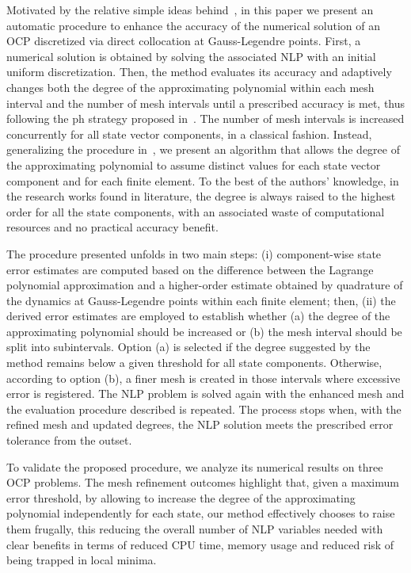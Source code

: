 Motivated by the relative simple ideas behind~\cite{Patterson:OCAM:2015}, in this paper we present an automatic procedure to enhance the accuracy of the numerical solution of an OCP discretized via direct collocation at Gauss-Legendre points. First, a numerical solution is obtained by solving the associated NLP with an initial uniform discretization. Then, the method evaluates its accuracy and adaptively changes both the degree of the approximating polynomial within each mesh interval and the number of mesh intervals until a prescribed accuracy is met, thus following the ph strategy proposed in~\cite{Patterson:OCAM:2015}.
The number of mesh intervals is increased concurrently for all state vector components, in a classical fashion. Instead, generalizing the procedure in~\cite{Patterson:OCAM:2015}, we present an algorithm that allows the degree of the approximating polynomial to assume distinct values for each state vector component and for each finite element. To the best of the authors' knowledge, in the research works found in literature, the degree is always raised to the highest order for all the state components, with an associated waste of computational resources and no practical accuracy benefit.
		
The procedure presented unfolds in two main steps: (i) component-wise state error estimates are computed based on the difference between the Lagrange polynomial approximation and a higher-order estimate obtained by quadrature of the dynamics at Gauss-Legendre points within each finite element; then, (ii) the derived error estimates are employed to establish whether (a) the degree of the approximating polynomial should be increased or (b) the mesh interval should be split into subintervals. Option (a) is selected if the degree suggested by the method remains below a given threshold for all state components. Otherwise, according to option (b), a finer mesh is created in those intervals where excessive error is registered.
The NLP problem is solved again with the enhanced mesh and the evaluation procedure described is repeated. The process stops when, with the refined mesh and updated degrees, the NLP solution meets the prescribed error tolerance from the outset.

To validate the proposed procedure, we analyze its numerical results on three OCP problems. The mesh refinement outcomes highlight that, given a maximum error threshold, by allowing to increase the degree of the approximating polynomial independently for each state, our method effectively chooses to raise them frugally, this reducing the overall number of NLP variables needed with clear benefits in terms of reduced CPU time, memory usage and reduced risk of being trapped in local minima.

